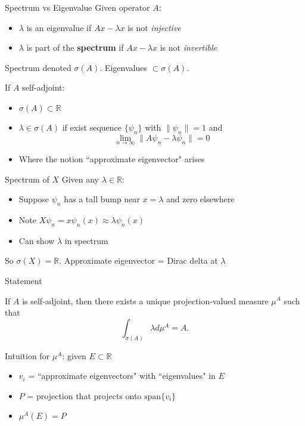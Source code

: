 \documentclass{beamer}
\theoremstyle{plain}
\theoremstyle{definition}
\renewcommand{\l}{\lambda}
\newcommand{\s}{\sigma}
\newcommand{\bR}{{\mathbb R}}
\renewcommand{\i}{\infty}
\begin{document}
\begin{frame}{Spectrum vs Eigenvalue}
    Given operator $A$:
    \begin{itemize}
        \item $\l$ is an eigenvalue if $Ax - \l x$ is not \textit{injective}
        \item $\l$ is part of the \textbf{spectrum} if $Ax - \l x$ is not \textit{invertible}
    \end{itemize}
    Spectrum denoted $\s(A)$. Eigenvalues $\subset \s(A)$.

    \pause
    \bigskip
    If $A$ self-adjoint:
    \begin{itemize}
        \item $\s(A) \subset \bR$
        \item $\l \in \s(A)$ if exist sequence $\{\psi_n\}$ with $\|\psi_n\| = 1$ and
            \[
                \lim_{n \rightarrow \i} \|A\psi_n - \l \psi_n\| = 0
            \]
        \item Where the notion ``approximate eigenvector" arises
    \end{itemize}
\end{frame}

\begin{frame}{Spectrum of $X$}
    Given any $\l \in \bR$:
    \begin{itemize}
        \item Suppose $\psi_n$ has a tall bump near $x = \l$ and zero elsewhere
        \item Note $X\psi_n = x\psi_n(x) \approx \l \psi_n(x)$
        \item Can show $\l$ in spectrum
    \end{itemize}

    So $\s(X) = \bR$. Approximate eigenvector = Dirac delta at $\l$
\end{frame}

\begin{frame}{Statement}
    \begin{theorem}
        If $A$ is self-adjoint, then there exists a unique projection-valued measure $\mu^A$ such that
        \[
            \int_{\s(A)} \l d\mu^A = A.
        \]
    \end{theorem}
    \medskip
    Intuition for $\mu^A$: given $E \subset \bR$
    \begin{itemize}
        \item $v_i$ = ``approximate eigenvectors" with ``eigenvalues" in $E$
        \item $P$ = projection that projects onto $\text{span}\{v_i\}$
        \item $\mu^A(E) = P$
    \end{itemize}
\end{frame}
\end{document}
